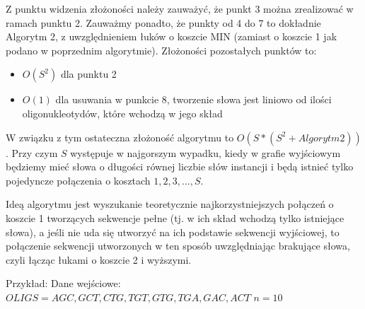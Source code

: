 \documentclass[a4paper,10pt]{article}
\begin{document}
Z punktu widzenia złożoności należy zauważyć, że punkt 3 można zrealizować w ramach punktu 2. Zauważmy ponadto, że punkty od 4 do 7 to dokładnie Algorytm 2, z uwzględnieniem łuków o koszcie MIN (zamiast o koszcie 1 jak podano w poprzednim algorytmie). Złożoności pozostałych punktów to:
\begin{itemize}
 \item $O(S^2)$ dla punktu 2
 \item $O(1)$ dla usuwania w punkcie 8, tworzenie słowa jest liniowo od ilości oligonukleotydów, które wchodzą w jego skład
\end{itemize}
W związku z tym ostateczna złożoność algorytmu to $O(S * (S^2 + Algorytm2))$. Przy czym $S$ występuje w najgorszym wypadku, kiedy w grafie wyjściowym będziemy mieć słowa o długości równej liczbie słów instancji i będą istnieć tylko pojedyncze połączenia o kosztach $1, 2, 3, ..., S$.

Ideą algorytmu jest wyszukanie teoretycznie najkorzystniejszych połączeń o koszcie 1 tworzących sekwencje pełne (tj. w ich skład wchodzą tylko istniejące słowa), a jeśli nie uda się utworzyć na ich podstawie sekwencji wyjściowej, to połączenie sekwencji utworzonych w ten sposób uwzględniając brakujące słowa, czyli łącząc łukami o koszcie 2 i wyższymi. 

Przykład:
Dane wejściowe:
$OLIGS = { AGC, GCT, CTG, TGT, GTG, TGA, GAC, ACT }$
$n = 10$

\end{document}
